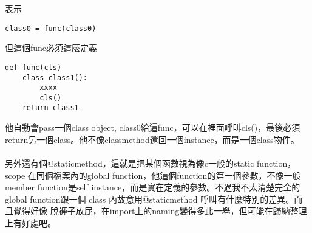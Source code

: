   表示
\begin{verbatim}
class0 = func(class0)
\end{verbatim}
  但這個func必須這麼定義
\begin{verbatim}
def func(cls)
    class class1():
        xxxx
        cls()
    return class1
\end{verbatim}
  他自動會pass一個class object, class0給這func，可以在裡面呼叫cls()，最後必須
  return另一個class。他不像classmethod還回一個instance，而是一個class物件。
  \\\\
  另外還有個@staticmethod，這就是把某個函數視為像c一般的static function，scope
  在同個檔案內的global function，他這個function的第一個參數，不像一般member
  function是self instance，而是實在定義的參數。不過我不太清楚完全的global
  function跟一個 class 內故意用@staticmethod 呼叫有什麼特別的差異。而且覺得好像
  脫褲子放屁，在import上的naming變得多此一舉，但可能在歸納整理上有好處吧。

